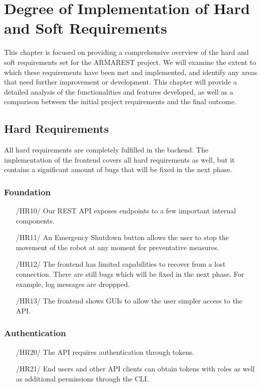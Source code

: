 \chapter{Degree of Implementation of Hard and Soft Requirements}

This chapter is focused on providing a comprehensive overview of the hard and soft requirements set for the ARMAREST project. We will examine the extent to which these requirements have been met and implemented, and identify any areas that need further improvement or development. This chapter will provide a detailed analysis of the functionalities and features developed, as well as a comparison between the initial project requirements and the final outcome.

\section{Hard Requirements}

All hard requirements are completely fulfilled in the backend. The implementation of the frontend covers all hard requirements as well, but it contains a significant amount of bugs that will be fixed in the next phase.

\subsection*{Foundation}
\begin{enumerate}
    \item[/HR10/] Our REST API exposes endpoints to a few important internal components.
    \item[/HR11/] An Emergency Shutdown button allows the user to stop the movement of the robot at any moment for preventative measures.
    \item[/HR12/] The \gls{frontend} has limited capabilities to recover from a lost connection. There are still bugs which will be fixed in the next phase. For example, log messages are droppped.
    \item[/HR13/] The \gls{frontend} shows GUIs to allow the user simpler access to the API.
\end{enumerate}

\subsection*{Authentication}
\begin{enumerate}
    \item[/HR20/] The API requires authentication through tokens.
    \item[/HR21/] End users and other API clients can obtain tokens with roles as well as additional permissions through the CLI. 
\end{enumerate}

